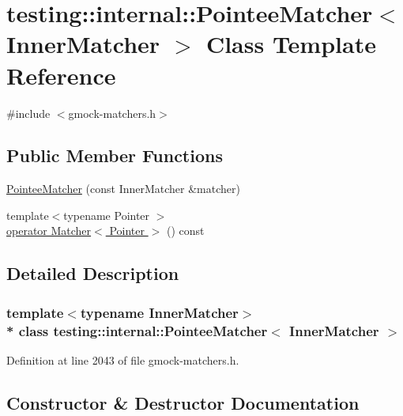 \hypertarget{classtesting_1_1internal_1_1_pointee_matcher}{}\section{testing\+:\+:internal\+:\+:Pointee\+Matcher$<$ Inner\+Matcher $>$ Class Template Reference}
\label{classtesting_1_1internal_1_1_pointee_matcher}


{\ttfamily \#include $<$gmock-\/matchers.\+h$>$}

\subsection*{Public Member Functions}
\begin{DoxyCompactItemize}
\item 
\hyperlink{classtesting_1_1internal_1_1_pointee_matcher_ad9f7d9dbd115c50811ce82ba27f1ba56}{Pointee\+Matcher} (const Inner\+Matcher \&matcher)
\item 
{\footnotesize template$<$typename Pointer $>$ }\\\hyperlink{classtesting_1_1internal_1_1_pointee_matcher_a3a96cad4ee9e684ff11023ff35c7551b}{operator Matcher$<$ Pointer $>$} () const 
\end{DoxyCompactItemize}


\subsection{Detailed Description}
\subsubsection*{template$<$typename Inner\+Matcher$>$\\*
class testing\+::internal\+::\+Pointee\+Matcher$<$ Inner\+Matcher $>$}



Definition at line 2043 of file gmock-\/matchers.\+h.



\subsection{Constructor \& Destructor Documentation}
